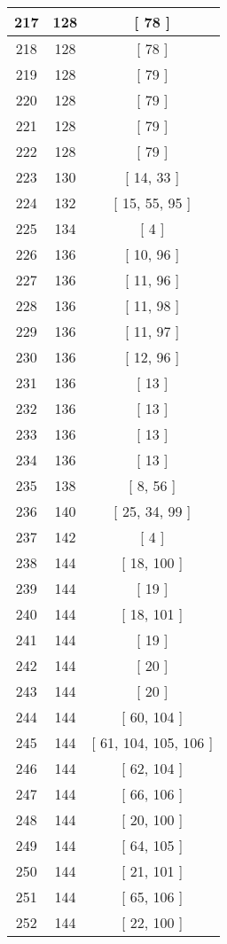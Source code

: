 \begin{center}
\begin{longtable}[H]{|| c c c ||}
\hline
217 & 128 & [ 78 ] \\ 
\hline
218 & 128 & [ 78 ] \\ 
\hline
219 & 128 & [ 79 ] \\ 
\hline
220 & 128 & [ 79 ] \\ 
\hline
221 & 128 & [ 79 ] \\ 
\hline
222 & 128 & [ 79 ] \\ 
\hline
223 & 130 & [ 14, 33 ] \\ 
\hline
224 & 132 & [ 15, 55, 95 ] \\ 
\hline
225 & 134 & [ 4 ] \\ 
\hline
226 & 136 & [ 10, 96 ] \\ 
\hline
227 & 136 & [ 11, 96 ] \\ 
\hline
228 & 136 & [ 11, 98 ] \\ 
\hline
229 & 136 & [ 11, 97 ] \\ 
\hline
230 & 136 & [ 12, 96 ] \\ 
\hline
231 & 136 & [ 13 ] \\ 
\hline
232 & 136 & [ 13 ] \\ 
\hline
233 & 136 & [ 13 ] \\ 
\hline
234 & 136 & [ 13 ] \\ 
\hline
235 & 138 & [ 8, 56 ] \\ 
\hline
236 & 140 & [ 25, 34, 99 ] \\ 
\hline
237 & 142 & [ 4 ] \\ 
\hline
238 & 144 & [ 18, 100 ] \\ 
\hline
239 & 144 & [ 19 ] \\ 
\hline
240 & 144 & [ 18, 101 ] \\ 
\hline
241 & 144 & [ 19 ] \\ 
\hline
242 & 144 & [ 20 ] \\ 
\hline
243 & 144 & [ 20 ] \\ 
\hline
244 & 144 & [ 60, 104 ] \\ 
\hline
245 & 144 & [ 61, 104, 105, 106 ] \\ 
\hline
246 & 144 & [ 62, 104 ] \\ 
\hline
247 & 144 & [ 66, 106 ] \\ 
\hline
248 & 144 & [ 20, 100 ] \\ 
\hline
249 & 144 & [ 64, 105 ] \\ 
\hline
250 & 144 & [ 21, 101 ] \\ 
\hline
251 & 144 & [ 65, 106 ] \\ 
\hline
252 & 144 & [ 22, 100 ] \\ 

\end{longtable}
\end{center}
